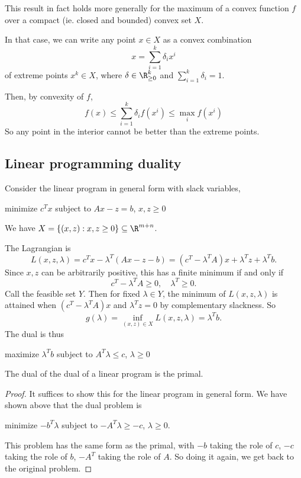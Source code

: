 \documentclass[a4paper]{article}
\begin{document}
This result in fact holds more generally for the maximum of a convex function $f$ over a compact (ie. closed and bounded) convex set $X$.

In that case, we can write any point $x\in X$ as a convex combination
\[
  x = \sum_{i = 1}^k \delta_i x^i
\]
of extreme points $x^k\in X$, where $\delta \in \R_{\geq 0}^k$ and $\sum_{i=1}^k \delta_i = 1$.

Then, by convexity of $f$,
\[
  f(x) \leq \sum_{i = 1}^k \delta_i f(x^i) \leq \max_i f(x^i)
\]
So any point in the interior cannot be better than the extreme points.
\subsection{Linear programming duality}
Consider the linear program in general form with slack variables,
\begin{center}
  minimize $c^Tx$ subject to $Ax - z = b$, $x, z\geq 0$
\end{center}
We have $X = \{(x, z): x, z\geq 0\}\subseteq \R^{m + n}$.

The Lagrangian is
\[
  L(x, z, \lambda) = c^Tx - \lambda^T(A x - z - b) = (c^T - \lambda^TA)x + \lambda^T z + \lambda^T b.
\]
Since $x, z$ can be arbitrarily positive, this has a finite minimum if and only if
\[
  c^T - \lambda^TA \geq 0,\quad \lambda^T \geq 0.
\]
Call the feasible set $Y$. Then for fixed $\lambda\in Y$, the minimum of $L(x, z, \lambda)$ is attained when $(c^T - \lambda^T A)x$ and $\lambda^T z = 0$ by complementary slackness. So
\[
  g(\lambda) = \inf_{(x, z) \in X} L(x, z, \lambda) = \lambda^T b.
\]
The dual is thus
\begin{center}
  maximize $\lambda^T b$ subject to $A^T\lambda \leq c$, $\lambda \geq 0$
\end{center}

\begin{thm}
  The dual of the dual of a linear program is the primal.
\end{thm}

\begin{proof}
  It suffices to show this for the linear program in general form. We have shown above that the dual problem is
  \begin{center}
    minimize $-b^T\lambda$ subject to $-A^T \lambda \geq -c$, $\lambda \geq 0$.
  \end{center}
  This problem has the same form as the primal, with $-b$ taking the role of $c$, $-c$ taking the role of $b$, $-A^T$ taking the role of $A$. So doing it again, we get back to the original problem.
\end{proof}
\end{document}
